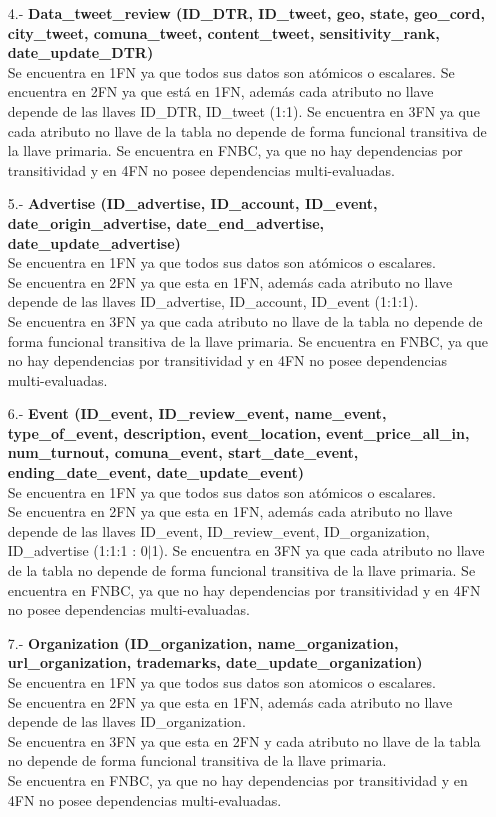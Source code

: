 \documentclass{memoria}
\begin{document}
\begin{itemize}
\item[4.-]\textbf{Data\_tweet\_review (ID\_DTR, ID\_tweet, geo, state, geo\_cord, city\_tweet, comuna\_tweet, content\_tweet, sensitivity\_rank, date\_update\_DTR)}
\\
Se encuentra en 1FN ya que todos sus datos son atómicos o escalares.
Se encuentra en 2FN ya que está en 1FN, además cada atributo no llave depende de las llaves ID\_DTR, ID\_tweet (1:1). Se encuentra en 3FN ya que cada atributo no llave de la tabla no depende de forma funcional transitiva de la llave primaria. Se encuentra en FNBC,  ya que no hay dependencias por transitividad y en  4FN no posee dependencias multi-evaluadas.

\item[5.-]\textbf{Advertise (ID\_advertise, ID\_account, ID\_event, date\_origin\_advertise, date\_end\_advertise, date\_update\_advertise)}
\\
Se encuentra en 1FN ya que todos sus datos son atómicos o escalares.\\
Se encuentra en 2FN ya que esta en 1FN, además cada atributo no llave depende de las llaves ID\_advertise, ID\_account, ID\_event  (1:1:1).\\
 Se encuentra en 3FN ya que cada atributo no llave de la tabla no depende de forma funcional transitiva de la llave primaria. Se encuentra en FNBC,  ya que no hay dependencias por transitividad y en  4FN no posee dependencias multi-evaluadas.
 
\item[6.-]\textbf{Event (ID\_event, ID\_review\_event, name\_event, type\_of\_event, description, event\_location, event\_price\_all\_in, num\_turnout, comuna\_event, start\_date\_event, ending\_date\_event, date\_update\_event)}
\\
Se encuentra en 1FN ya que todos sus datos son atómicos o escalares.\\
Se encuentra en 2FN ya que esta en 1FN, además cada atributo no llave depende de las llaves ID\_event, ID\_review\_event, ID\_organization, ID\_advertise (1:1:1 : 0$|$1). Se encuentra en 3FN ya que cada atributo no llave de la tabla no depende de forma funcional transitiva de la llave primaria. Se encuentra en FNBC,  ya que no hay dependencias por transitividad y en  4FN no posee dependencias multi-evaluadas.

\item[7.-]\textbf{Organization (ID\_organization, name\_organization,  url\_organization, trademarks,  date\_update\_organization)}
\\
Se encuentra en 1FN ya que todos sus datos son atomicos o escalares.
\\Se encuentra en 2FN ya que esta en 1FN, además cada atributo no llave depende de las llaves ID\_organization. \\
Se encuentra en 3FN ya que esta en 2FN  y cada atributo no llave de la tabla no depende de forma funcional transitiva de la llave primaria. 
\\Se encuentra en FNBC,  ya que no hay dependencias por transitividad y en  4FN no posee dependencias multi-evaluadas.


\end{itemize}
\end{document}
